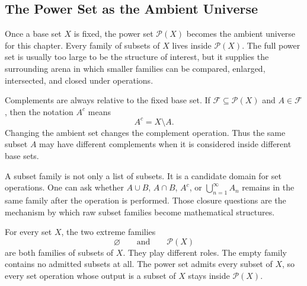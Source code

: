 \subsection{The Power Set as the Ambient Universe}

\begin{remark*}[Exposition]
Once a base set \(X\) is fixed, the power set \(\mathcal{P}(X)\) becomes the
ambient universe for this chapter.  Every family of subsets of \(X\) lives
inside \(\mathcal{P}(X)\).  The full power set is usually too large to be the
structure of interest, but it supplies the surrounding arena in which smaller
families can be compared, enlarged, intersected, and closed under operations.
\end{remark*}

\begin{remark*}
Complements are always relative to the fixed base set.  If
\(\mathcal{F}\subseteq\mathcal{P}(X)\) and \(A\in\mathcal{F}\), then the
notation \(A^c\) means
\[
  A^c = X\setminus A.
\]
Changing the ambient set changes the complement operation.  Thus the same
subset \(A\) may have different complements when it is considered inside
different base sets.
\end{remark*}

\begin{remark*}
A subset family is not only a list of subsets.  It is a candidate domain for
set operations.  One can ask whether \(A\cup B\), \(A\cap B\), \(A^c\), or
\(\bigcup_{n=1}^{\infty}A_n\) remains in the same family after the operation
is performed.  Those closure questions are the mechanism by which raw subset
families become mathematical structures.
\end{remark*}

\begin{remark*}
For every set \(X\), the two extreme families
\[
  \varnothing
  \qquad\text{and}\qquad
  \mathcal{P}(X)
\]
are both families of subsets of \(X\).  They play different roles.  The empty
family contains no admitted subsets at all.  The power set admits every subset
of \(X\), so every set operation whose output is a subset of \(X\) stays inside
\(\mathcal{P}(X)\).
\end{remark*}
